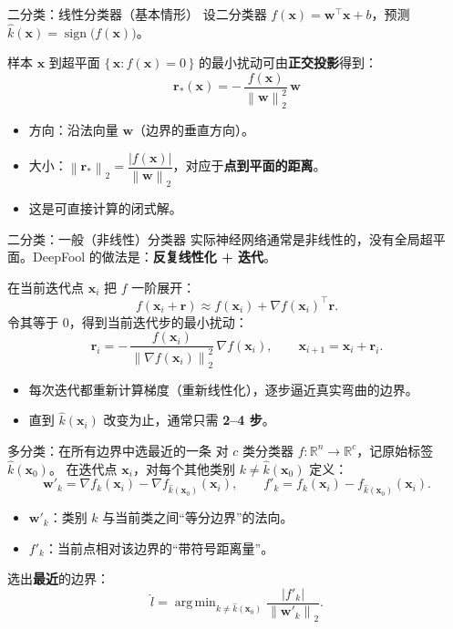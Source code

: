 \documentclass[aspectratio=169,11pt]{beamer}
\DeclareMathOperator*{\argmin}{arg\,min}
\DeclareMathOperator{\sign}{sign}
\newcommand{\norm}[1]{\left\lVert #1 \right\rVert}
\newcommand{\bx}{\boldsymbol{x}}
\newcommand{\br}{\boldsymbol{r}}
\newcommand{\bw}{\boldsymbol{w}}
\begin{document}
\begin{frame}{二分类：线性分类器（基本情形）}
  设二分类器 $f(\bx)=\bw^\top\bx + b$，预测 $\hat k(\bx)=\sign\!\big(f(\bx)\big)$。
  \vspace{0.4em}

  样本 $\bx$ 到超平面 $\{\,\bx: f(\bx)=0\,\}$ 的最小扰动可由\textbf{正交投影}得到：
  \[
    \boxed{\;\br_*(\bx) = -\,\frac{f(\bx)}{\norm{\bw}_2^{2}}\,\bw\;}
  \]
  \begin{itemize}
    \item 方向：沿法向量 $\bw$（边界的垂直方向）。
    \item 大小：$\norm{\br_*}_2 = \dfrac{|f(\bx)|}{\norm{\bw}_2}$，对应于\textbf{点到平面的距离}。
    \item 这是可直接计算的闭式解。
  \end{itemize}
\end{frame}

\begin{frame}{二分类：一般（非线性）分类器}
  实际神经网络通常是非线性的，没有全局超平面。DeepFool 的做法是：\textbf{反复线性化 + 迭代}。
  \vspace{0.4em}

  在当前迭代点 $\bx_i$ 把 $f$ 一阶展开：
  \[
    f(\bx_i + \br) \approx f(\bx_i) + \nabla f(\bx_i)^\top \br .
  \]
  令其等于 0，得到当前迭代步的最小扰动：
  \[
    \br_i = -\,\frac{f(\bx_i)}{\norm{\nabla f(\bx_i)}_2^{2}}\,\nabla f(\bx_i),
    \qquad \bx_{i+1} = \bx_i + \br_i .
  \]
  \begin{itemize}
    \item 每次迭代都重新计算梯度（重新线性化），逐步逼近真实弯曲的边界。
    \item 直到 $\hat k(\bx_i)$ 改变为止，通常只需 \textbf{2--4 步}。
  \end{itemize}
\end{frame}

\begin{frame}{多分类：在所有边界中选最近的一条}
  对 $c$ 类分类器 $f:\mathbb{R}^n\to\mathbb{R}^c$，记原始标签 $\hat k(\bx_0)$。
  在迭代点 $\bx_i$，对每个其他类别 $k \neq \hat k(\bx_0)$ 定义：
  \[
    \bw'_k = \nabla f_k(\bx_i) - \nabla f_{\hat k(\bx_0)}(\bx_i),
    \qquad
    f'_k = f_k(\bx_i) - f_{\hat k(\bx_0)}(\bx_i).
  \]
  \begin{itemize}
    \item $\bw'_k$：类别 $k$ 与当前类之间“等分边界”的法向。
    \item $f'_k$：当前点相对该边界的“带符号距离量”。
  \end{itemize}
  \vspace{0.3em}
  选出\textbf{最近}的边界：
  \[
    \hat l = \argmin_{k \neq \hat k(\bx_0)} \frac{|f'_k|}{\norm{\bw'_k}_2}.
  \]
\end{frame}
\end{document}
